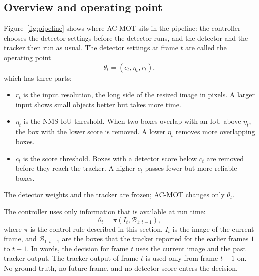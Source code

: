 \documentclass[journal]{new-aiaa}
\begin{document}
\subsection{Overview and operating point}\label{sec:overview}
Figure~\ref{fig:pipeline} shows where AC-MOT sits in the pipeline: the
controller chooses the detector settings before the detector runs, and the
detector and the tracker then run as usual. The detector settings at frame
$t$ are called the operating point
\begin{equation}
\theta_t = (c_t, \eta_t, r_t),
\label{eq:theta}
\end{equation}
which has three parts:
\begin{itemize}
\item $r_t$ is the input resolution, the long side of the resized image in
      pixels. A larger input shows small objects better but takes more time.
\item $\eta_t$ is the NMS IoU threshold. When two boxes overlap with an
      IoU above $\eta_t$, the box with the lower
      score is removed. A lower $\eta_t$ removes more overlapping boxes.
\item $c_t$ is the score threshold. Boxes with a detector score below $c_t$
      are removed before they reach the tracker. A higher $c_t$ passes fewer
      but more reliable boxes.
\end{itemize}
The detector weights and the tracker are frozen; AC-MOT changes only
$\theta_t$.

The controller uses only information that is available at run time:
\begin{equation}
\theta_t = \pi\left(I_t, \mathcal{B}_{1:t-1}\right),
\label{eq:policy}
\end{equation}
where $\pi$ is the control rule described in this section, $I_t$ is the image
of the current frame, and $\mathcal{B}_{1:t-1}$ are the boxes that the tracker
reported for the earlier frames $1$ to $t-1$. In words, the decision for frame
$t$ uses the current image and the past tracker output. The tracker output of
frame $t$ is used only from frame $t+1$ on. No ground truth, no future frame,
and no detector score enters the decision.
\end{document}
